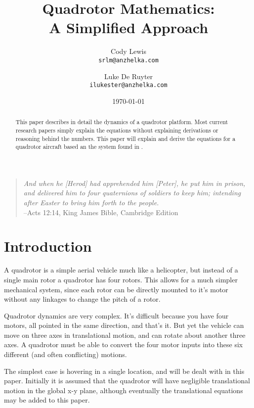 \documentclass{article}
\numberwithin{equation}{section} %
\begin{document}
\title{Quadrotor Mathematics: \\ A Simplified Approach}
\author{Cody Lewis \\ \texttt{srlm@anzhelka.com} \and Luke De Ruyter \\ \texttt{ilukester@anzhelka.com} }
\date{\today}
\maketitle
\begin{verse}\textit{
And when he [Herod] had apprehended him [Peter], he put him in prison, and delivered him to four quaternions of soldiers to keep him; intending after Easter to bring him forth to the people.} \\
\hfill --Acts 12:14, King James Bible, Cambridge Edition
\end{verse}

\begin{abstract}
This paper describes in detail the dynamics of a quadrotor platform. Most current research papers simply explain the equations without explaining derivations or reasoning behind the numbers. This paper will explain and derive the equations for a quadrotor aircraft based an the system found in \cite{stingu09}.
\end{abstract}

\section{Introduction}

A quadrotor is a simple aerial vehicle much like a helicopter, but instead of a single main rotor a quadrotor has four rotors. This allows for a much simpler mechanical system, since each rotor can be directly mounted to it's motor without any linkages to change the pitch of a rotor.

Quadrotor dynamics are very complex. It's difficult because you have four motors, all pointed in the same direction, and that's it. But yet the vehicle can move on three axes in translational motion, and can rotate about another three axes. A quadrotor must be able to convert the four motor inputs into these six different (and often conflicting) motions.

The simplest case is hovering in a single location, and will be dealt with in this paper. Initially it is assumed that the quadrotor will have negligible translational motion in the global x-y plane, although eventually the translational equations may be added to this paper.
\end{document}
